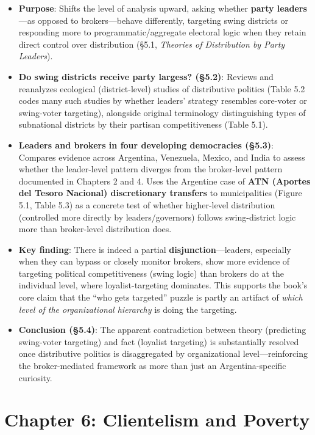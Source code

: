 \documentclass[12pt]{article}
\begin{document}
\begin{itemize}[leftmargin=*, itemsep=4pt]
    \item \textbf{Purpose}: Shifts the level of analysis upward, asking whether \textbf{party leaders}---as opposed to brokers---behave differently, targeting swing districts or responding more to programmatic/aggregate electoral logic when they retain direct control over distribution (\S5.1, \textit{Theories of Distribution by Party Leaders}).
    \item \textbf{Do swing districts receive party largess? (\S5.2)}: Reviews and reanalyzes ecological (district-level) studies of distributive politics (Table 5.2 codes many such studies by whether leaders' strategy resembles core-voter or swing-voter targeting), alongside original terminology distinguishing types of subnational districts by their partisan competitiveness (Table 5.1).
    \item \textbf{Leaders and brokers in four developing democracies (\S5.3)}: Compares evidence across Argentina, Venezuela, Mexico, and India to assess whether the leader-level pattern diverges from the broker-level pattern documented in Chapters 2 and 4. Uses the Argentine case of \textbf{ATN (Aportes del Tesoro Nacional) discretionary transfers} to municipalities (Figure 5.1, Table 5.3) as a concrete test of whether higher-level distribution (controlled more directly by leaders/governors) follows swing-district logic more than broker-level distribution does.
    \item \textbf{Key finding}: There is indeed a partial \textbf{disjunction}---leaders, especially when they can bypass or closely monitor brokers, show more evidence of targeting political competitiveness (swing logic) than brokers do at the individual level, where loyalist-targeting dominates. This supports the book's core claim that the ``who gets targeted'' puzzle is partly an artifact of \emph{which level of the organizational hierarchy} is doing the targeting.
    \item \textbf{Conclusion (\S5.4)}: The apparent contradiction between theory (predicting swing-voter targeting) and fact (loyalist targeting) is substantially resolved once distributive politics is disaggregated by organizational level---reinforcing the broker-mediated framework as more than just an Argentina-specific curiosity.
\end{itemize}

\section{Chapter 6: Clientelism and Poverty}
\end{document}
